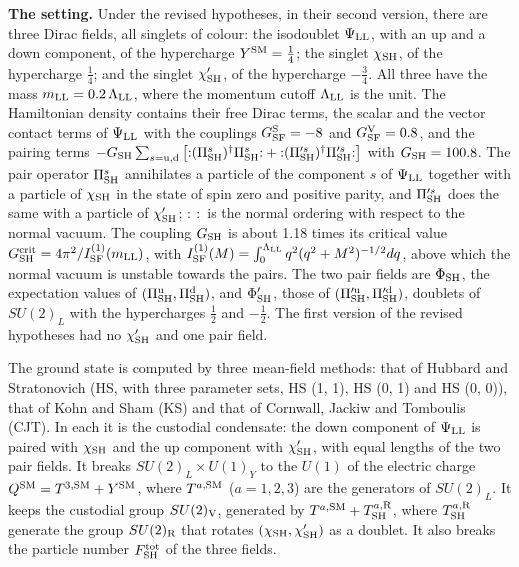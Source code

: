 \documentclass[
  10pt,
]{article}
\begin{document}
\textbf{The setting.} Under the revised hypotheses, in their second
version, there are three Dirac fields, all singlets of colour: the
isodoublet \(\Psi_{\rm LL}\), with an up and a down component, of the
hypercharge \(Y^{\rm SM}=\tfrac14\); the singlet \(\chi_{\rm SH}\), of
the hypercharge \(\tfrac14\); and the singlet \(\chi'_{\rm SH}\), of the
hypercharge \(-\tfrac34\). All three have the mass
\(m_{\rm LL}=0.2\,\Lambda_{\rm LL}\), where the momentum cutoff
\(\Lambda_{\rm LL}\) is the unit. The Hamiltonian density contains their
free Dirac terms, the scalar and the vector contact terms of
\(\Psi_{\rm LL}\) with the couplings \(G^{\rm S}_{\rm SF}=-8\) and
\(G^{\rm V}_{\rm SF}=0.8\), and the pairing terms
\(-G_{\rm SH}\sum_{s={\rm u},{\rm d}}\big[{:}(\Pi^s_{\rm SH})^\dagger\Pi^s_{\rm SH}{:}+{:}(\Pi'^s_{\rm SH})^\dagger\Pi'^s_{\rm SH}{:}\big]\)
with \(G_{\rm SH}=100.8\). The pair operator \(\Pi^s_{\rm SH}\)
annihilates a particle of the component \(s\) of \(\Psi_{\rm LL}\)
together with a particle of \(\chi_{\rm SH}\) in the state of spin zero
and positive parity, and \(\Pi'^s_{\rm SH}\) does the same with a
particle of \(\chi'_{\rm SH}\); \({:}\ {:}\) is the normal ordering with
respect to the normal vacuum. The coupling \(G_{\rm SH}\) is about 1.18
times its critical value
\(G^{\rm crit}_{\rm SH}=4\pi^2/I^{(1)}_{\rm SF}(m_{\rm LL})\), with
\(I^{(1)}_{\rm SF}(M)=\int_0^{\Lambda_{\rm LL}}q^2(q^2+M^2)^{-1/2}dq\),
above which the normal vacuum is unstable towards the pairs. The two
pair fields are \(\Phi_{\rm SH}\), the expectation values of
\((\Pi^{\rm u}_{\rm SH},\Pi^{\rm d}_{\rm SH})\), and \(\Phi'_{\rm SH}\),
those of \((\Pi'^{\rm u}_{\rm SH},\Pi'^{\rm d}_{\rm SH})\), doublets of
\(SU(2)_L\) with the hypercharges \(\tfrac12\) and \(-\tfrac12\). The
first version of the revised hypotheses had no \(\chi'_{\rm SH}\) and
one pair field.

The ground state is computed by three mean-field methods: that of
Hubbard and Stratonovich (HS, with three parameter sets, HS (1, 1), HS
(0, 1) and HS (0, 0)), that of Kohn and Sham (KS) and that of Cornwall,
Jackiw and Tomboulis (CJT). In each it is the custodial condensate: the
down component of \(\Psi_{\rm LL}\) is paired with \(\chi_{\rm SH}\) and
the up component with \(\chi'_{\rm SH}\), with equal lengths of the two
pair fields. It breaks \(SU(2)_L\times U(1)_Y\) to the \(U(1)\) of the
electric charge \(Q^{\rm SM}=T^{3,{\rm SM}}+Y^{\rm SM}\), where
\(T^{a,{\rm SM}}\) (\(a=1,2,3\)) are the generators of \(SU(2)_L\). It
keeps the custodial group \(SU(2)_{\rm V}\), generated by
\(T^{a,{\rm SM}}+T^{a,{\rm R}}_{\rm SH}\), where
\(T^{a,{\rm R}}_{\rm SH}\) generate the group \(SU(2)_{\rm R}\) that
rotates \((\chi_{\rm SH},\chi'_{\rm SH})\) as a doublet. It also breaks
the particle number \(F^{\rm tot}_{\rm SH}\) of the three fields.
\end{document}
